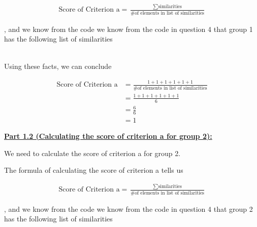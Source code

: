 \documentclass[12pt]{article}
\begin{document}
\begin{mdframed}
\begin{itemize}
\begin{mdframed}
            \begin{align}
                \text{Score of Criterion a} = \frac{\sum \text{similarities}}{\text{\# of elements in list of similarities}}
            \end{align}

            , and we know from the code we know from the code in question 4 that group 1 has the following
            list of similarities

            \begin{align}
                [1,1,1,1,1,1]
            \end{align}

            \bigskip

            Using these facts, we can conclude

            \begin{align}
                \text{Score of Criterion a} &= \frac{1 + 1 + 1 + 1 + 1 + 1}{\text{\# of elements in list of similarities}}\\
                &= \frac{1 + 1 + 1 + 1 + 1 + 1}{6}\\
                &= \frac{6}{6}\\
                &= 1
            \end{align}

            \bigskip

            \underline{\textbf{Part 1.2 (Calculating the score of criterion a for group 2):}}

            \bigskip

            We need to calculate the score of criterion a for group 2.

            \bigskip

            The formula of calculating the score of criterion a tells us

            \begin{align}
                \text{Score of Criterion a} = \frac{\sum \text{similarities}}{\text{\# of elements in list of similarities}}
            \end{align}

            , and we know from the code we know from the code in question 4 that group 2 has the following
            list of similarities

            \begin{align}
                [1,0.8,0.8,0.8,0.8,1]
            \end{align}

            \bigskip


\end{mdframed}
\end{itemize}
\end{mdframed}
\end{document}
